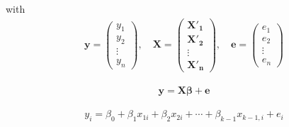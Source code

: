 with
\begin{eqnarray*}
\boldsymbol{y}=\left( \begin{array}{c}
y_1\\
y_2\\
\vdots\\
y_n \end{array} \right), \quad \boldsymbol{X}=\left( \begin{array}{c}
\boldsymbol{X'_1}\\
\boldsymbol{X'_2}\\
\vdots\\
\boldsymbol{X'_n}\end{array} \right), \quad \boldsymbol{e}=\left( \begin{array}{c}
e_1\\
e_2\\
\vdots\\
e_n\end{array} \right)
\end{eqnarray*}
\begin{eqnarray*}
\boldsymbol{y} = \boldsymbol{X\beta} + \boldsymbol{e} 
\end{eqnarray*}
\begin{eqnarray*}
y_{i}=\beta_{0}+\beta_{1}x_{1i}+\beta_{2}x_{2i}+\cdots+\beta_{k-1}x_{k-1,i}+e_{i}
\end{eqnarray*}

